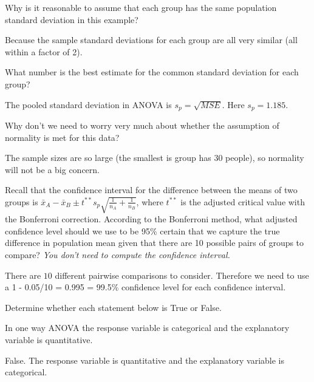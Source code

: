 \documentclass[11pt,answers]{exam}
\newcommand{\ds}{\displaystyle}
\begin{document}
\begin{questions}
\begin{parts}
\item Why is it reasonable to assume that each group has the same population standard deviation in this example? 
\begin{solution}
Because the sample standard deviations for each group are all very similar (all within a factor of 2).
\end{solution}
\vfill

\item What number is the best estimate for the common standard deviation for each group?
\begin{solution}
The pooled standard deviation in ANOVA is $s_p = \sqrt{MSE}$.  Here $s_p = 1.185$.
\end{solution}
\vfill


\item Why don't we need to worry very much about whether the assumption of normality is met for this data? 
\begin{solution}
The sample sizes are so large (the smallest is group has 30 people), so normality will not be a big concern.
\end{solution}
\vfill

\newpage
\item Recall that the confidence interval for the difference between the means of two groups is $\ds \bar{x}_A - \bar{x}_B \pm t^{**} s_p \sqrt{\frac{1}{n_A} + \frac{1}{n_B}}$, where $t^{**}$ is the adjusted critical value with the Bonferroni correction.  According to the Bonferroni method, what adjusted confidence level should we use to be 95\% certain that we capture the true difference in population mean given that there are 10 possible pairs of groups to compare? \textit{You don't need to compute the confidence interval.}  
\begin{solution}
There are $10$ different pairwise comparisons to consider. Therefore we need to use a 1 - 0.05/10 = 0.995 = 99.5\% confidence level for each confidence interval.   
\end{solution}
\vfill
\vfill

\end{parts}

\question Determine whether each statement below is True or False.   
\begin{parts}
\item In one way ANOVA the response variable is categorical and the explanatory variable is quantitative.  
\begin{solution}
False. The response variable is quantitative and  the explanatory variable is  categorical.
\end{solution}
\vfill



\end{parts}
\end{questions}
\end{document}
